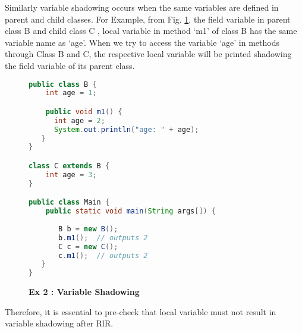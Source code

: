 Similarly variable shadowing occurs when the same variables are defined in parent and child classes.
For Example, from Fig. \ref{figure:precond5_3}, the field variable  in parent class B and child class C , local variable in method `m1' of class B has the same variable name as `age'. When we try to access the variable `age' in methods through Class B and C, the respective local variable will be printed shadowing the field variable of its parent class.
\begin{figure}[th]
\centering
\begin{minipage}[t]{0.8\linewidth}
\begin{lstlisting}[language=java, basicstyle=\scriptsize\ttfamily,frame=single]
public class B {
    int age = 1;

    public void m1() {
      int age = 2;
      System.out.println("age: " + age);
   }
}

class C extends B {
    int age = 3;
}

public class Main {
    public static void main(String args[]) {
  
       B b = new B();
       b.m1(); 	// outputs 2
       C c = new C();
       c.m1(); 	// outputs 2
   }
}
\end{lstlisting}
\end{minipage}
\caption{\textbf{Ex 2 : Variable Shadowing}}
\label{figure:precond5_3}
\end{figure}

Therefore, it is essential to pre-check that local variable must not result in variable shadowing after RlR.